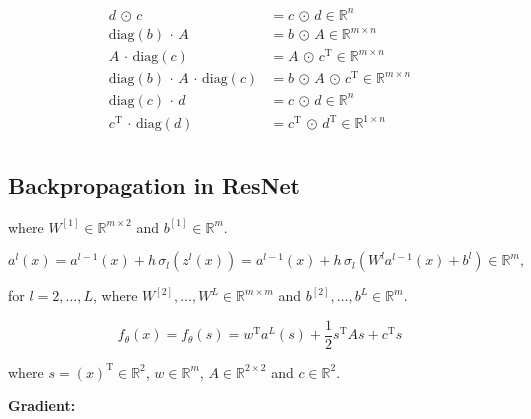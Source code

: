 \begin{align*}
    d \, \odot \, c &= c \, \odot \, d \in \mathbb{R}^{n} \\
    \mathrm{diag}\left(b\right) \, \cdot \, A &= b \, \odot \, A \in \mathbb{R}^{m \times n} \\
    A \, \cdot \, \mathrm{diag}\left(c\right) &= A \, \odot \, c^{\mathrm{T}} \in \mathbb{R}^{m \times n} \\
    \mathrm{diag}\left(b\right) \, \cdot \, A \, \cdot \, \mathrm{diag}\left(c\right) &= b \, \odot \, A \, \odot \, c^{\mathrm{T}} \in \mathbb{R}^{m \times n} \\
    \mathrm{diag}\left(c\right) \, \cdot \, d &= c \, \odot \, d \in \mathbb{R}^{n} \\
    c^{\mathrm{T}} \, \cdot \, \mathrm{diag}\left(d\right) &= c^{\mathrm{T}} \, \odot \, d^{\mathrm{T}} \in \mathbb{R}^{1 \times n} \\
\end{align*}







\subsection{Backpropagation in ResNet}



where $W^{[1]} \in \mathbb{R}^{m \times 2}$ and $b^{[1]} \in \mathbb{R}^{m}$.

\begin{equation*}
    a^{l}\left(x\right) = a^{l-1}\left(x\right) + h \, \sigma_{l} \left(z^{l}\left(x\right)\right) = a^{l-1}\left(x\right) + h \, \sigma_{l} \left(W^{l} a^{l-1}\left(x\right) + b^{l}\right) \in \mathbb{R}^{m}, 
\end{equation*}

for $l = 2, \ldots, L$, where $W^{[2]}, \ldots, W^{L} \in \mathbb{R}^{m \times m}$ and $b^{[2]}, \ldots, b^{L} \in \mathbb{R}^{m}$.

\begin{equation*}
    f_{\theta}\left(x\right) = f_{\theta}\left(s\right) = w^{\mathrm{T}} a^{L}\left(s\right) + \frac{1}{2} s^{\mathrm{T}} A s + c^{\mathrm{T}} s 
\end{equation*}

where $s = \left(x\right)^{\mathrm{T}} \in \mathbb{R}^{2}$, $w \in \mathbb{R}^{m}$, $A \in \mathbb{R}^{2 \times 2}$ and $c \in \mathbb{R}^2$.

\textbf{Gradient:}

